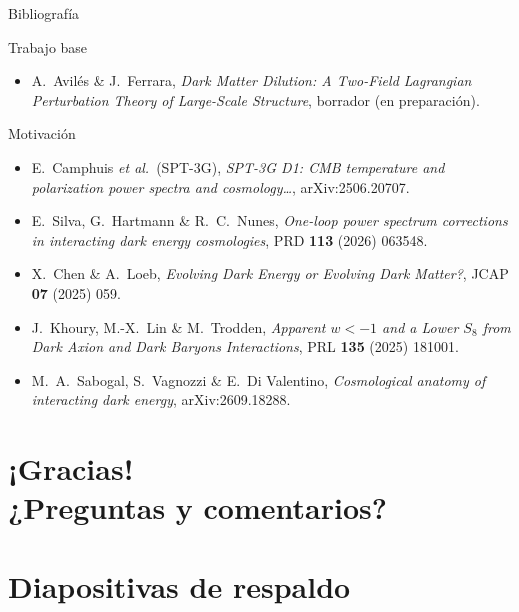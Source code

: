 \documentclass[aspectratio=169]{beamer}
\newcommand{\etal}{\textit{et al.}}
\begin{document}
\begin{frame}{Bibliografía}
  \scriptsize
  \begin{block}{Trabajo base}
    \begin{itemize}
      \item A.~Avilés \& J.~Ferrara, \textit{Dark Matter Dilution: A Two-Field Lagrangian
        Perturbation Theory of Large-Scale Structure}, borrador (en preparación).
    \end{itemize}
  \end{block}
  \begin{exampleblock}{Motivación}
    \begin{itemize}
      \item E.~Camphuis \etal\ (SPT-3G), \textit{SPT-3G D1: CMB temperature and polarization
        power spectra and cosmology\ldots}, arXiv:2506.20707.
      \item E.~Silva, G.~Hartmann \& R.~C.~Nunes, \textit{One-loop power spectrum corrections in
        interacting dark energy cosmologies}, PRD \textbf{113} (2026) 063548.
      \item X.~Chen \& A.~Loeb, \textit{Evolving Dark Energy or Evolving Dark Matter?},
        JCAP \textbf{07} (2025) 059.
      \item J.~Khoury, M.-X.~Lin \& M.~Trodden, \textit{Apparent $w<-1$ and a Lower $S_8$ from
        Dark Axion and Dark Baryons Interactions}, PRL \textbf{135} (2025) 181001.
      \item M.~A.~Sabogal, S.~Vagnozzi \& E.~Di Valentino, \textit{Cosmological anatomy of
        interacting dark energy}, arXiv:2609.18288.
    \end{itemize}
  \end{exampleblock}
\end{frame}

\section{¡Gracias! \texorpdfstring{\\[0.4em]}{} {\normalsize ¿Preguntas y comentarios?}}

\appendix
\section{Diapositivas de respaldo}
\end{document}
